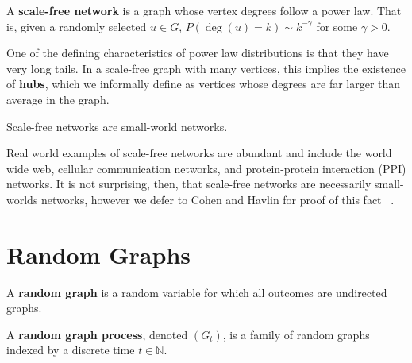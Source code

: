 



\begin{definition}
  A \textbf{scale-free network} is a graph whose vertex degrees follow a power
  law. That is, given a randomly selected $u \in G$, $P(\deg(u) = k) \sim
  k^{-\gamma}$ for some $\gamma > 0$.
\end{definition}

One of the defining characteristics of power law distributions is that they have
very long tails. In a scale-free graph with many vertices, this implies the
existence of \textbf{hubs}, which we informally define as vertices whose degrees
are far larger than average in the graph.

\begin{theorem}
  Scale-free networks are small-world networks.
\end{theorem}

Real world examples of scale-free networks are abundant and include the world
wide web, cellular communication networks, and protein-protein interaction (PPI)
networks. It is not surprising, then, that scale-free networks are necessarily
small-worlds networks, however we defer to Cohen and Havlin for proof of this
fact ~\cite{PhysRevLett.90.058701}.


\section{Random Graphs}

\begin{definition}
  A \textbf{random graph} is a random variable for which all outcomes are
  undirected graphs.

  A \textbf{random graph process}, denoted $(G_t)$, is a family of random graphs
  indexed by a discrete time $t \in \mathbb{N}$.
\end{definition}

